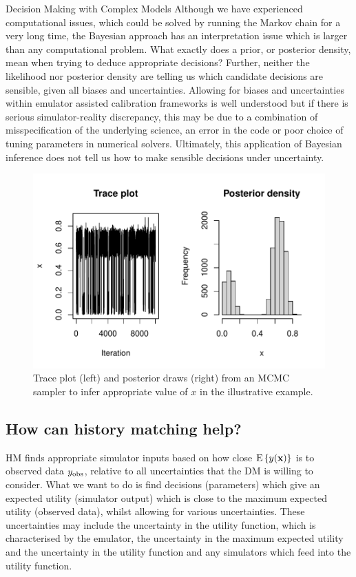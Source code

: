 \begin{chapter}{Decision Making with Complex Models \label{Chap:optimisation}}
Although we have experienced computational issues, which could be solved by running the Markov chain for a very long time, the Bayesian approach has an interpretation issue which is larger than any computational problem. What exactly does a prior, or posterior density, mean when trying to deduce appropriate decisions? Further, neither the likelihood nor posterior density are telling us which candidate decisions are sensible, given all biases and uncertainties. Allowing for biases and uncertainties within emulator assisted calibration frameworks is well understood \citep{Ohagan01, Goldstein2009} but if there is serious simulator-reality discrepancy, this may be due to a combination of misspecification of the underlying science, an error in the code or poor choice of tuning parameters in numerical solvers. Ultimately, this application of Bayesian inference does not tell us how to make sensible decisions under uncertainty.
\begin{figure}
 \centering
 \includegraphics{fig-optim/trace-and-density.pdf}
 \caption{Trace plot (left) and posterior draws (right) from an MCMC sampler to infer appropriate value of $x$ in the illustrative example. \label{Fig:mcmc-chain}}
\end{figure}
\subsection{How can history matching help?}
HM finds appropriate simulator inputs based on how close $\textrm{E}\,\{y(\mathbf{x})\}$ is to observed data $y_{\text{obs}}$, relative to all uncertainties that the DM is willing to consider. What we want to do is find decisions (parameters) which give an expected utility (simulator output) which is close to the maximum expected utility (observed data), whilst allowing for various uncertainties. These uncertainties may include the uncertainty in the utility function, which is characterised by the emulator, the uncertainty in the maximum expected utility and the uncertainty in the utility function and any simulators which feed into the utility function.


\end{chapter}
